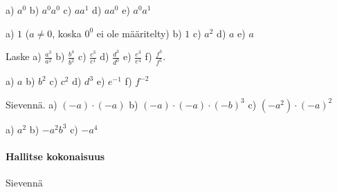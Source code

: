 \begin{tehtavasivu}
    \begin{tehtava}
        a) $a^0$
        b) $a^0a^0$
        c) $aa^1$
        d) $aa^0$
        e) $a^0a^1$
        
        \begin{vastaus}
            a) $1$  ($a\neq0$, koska $0^0$ ei ole määritelty)
            b) $1$
            c) $a^2$
            d) $a$
            e) $a$
        \end{vastaus}
    \end{tehtava}

    \begin{tehtava}
        Laske
        a) $\frac{a^3}{a^2}$
        b) $\frac{b^4}{b^2}$
        c) $\frac{c^3}{c^1}$
        d) $\frac{d^3}{d^0}$
        e) $\frac{e^3}{e^4}$
        f) $\frac{f^3}{f^5}$.
        
        \begin{vastaus}
            a) $a$
            b) $b^2$
            c) $c^2$
            d) $d^3$
            e) $e^{-1}$
            f) $f^{-2}$
        \end{vastaus}
    \end{tehtava}
    
        \begin{tehtava}
     Sievennä.
        a) $(-a)\cdot(-a)$ 
        b) $(-a)\cdot(-a)\cdot(-b)^3$ 
        c) $(-a^2)\cdot(-a)^2$

        \begin{vastaus}
            a) $a^2$ 
            b) $-a^2b^3$ 
            c) $-a^4$
        \end{vastaus}
    \end{tehtava}
    
\paragraph*{Hallitse kokonaisuus}



\begin{tehtava}
  		Sievennä
        \begin{alakohdatrivi}
 		\end{alakohdatrivi}
        \begin{vastaus}
        \begin{alakohdatrivi}
        \end{alakohdatrivi}
        \end{vastaus}
\end{tehtava}


\end{tehtavasivu}
